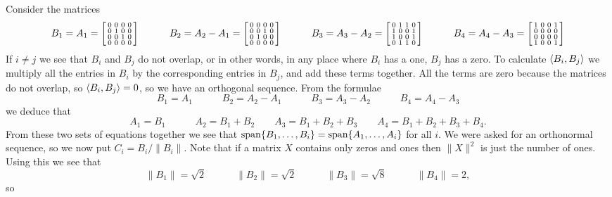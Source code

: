  Consider the matrices
 {\tiny \[
  B_1=A_1 = \left[\begin{smallmatrix} 0&0&0&0\\ 0&1&0&0\\ 0&0&1&0\\ 0&0&0&0\end{smallmatrix}\right]
  \hspace{3em}
  B_2=A_2-A_1 = \left[\begin{smallmatrix} 0&0&0&0\\ 0&0&1&0\\ 0&1&0&0\\ 0&0&0&0\end{smallmatrix}\right]
  \hspace{3em}
  B_3=A_3-A_2 = \left[\begin{smallmatrix} 0&1&1&0\\ 1&0&0&1\\ 1&0&0&1\\ 0&1&1&0\end{smallmatrix}\right]
  \hspace{3em}
  B_4=A_4-A_3 = \left[\begin{smallmatrix} 1&0&0&1\\ 0&0&0&0\\ 0&0&0&0\\ 1&0&0&1\end{smallmatrix}\right]
 \]}
 If $i\neq j$ we see that $B_i$ and $B_j$ do not overlap, or
 in other words, in any place where $B_i$ has a one, $B_j$
 has a zero.  To calculate $\langle B_i,B_j\rangle$ we multiply all
 the entries in $B_i$ by the corresponding entries in $B_j$,
 and add these terms together.  All the terms are zero
 because the matrices do not overlap, so $\langle B_i,B_j\rangle=0$,
 so we have an orthogonal sequence.  From the formulae
 \[ B_1=A_1     \hspace{3em}
    B_2=A_2-A_1 \hspace{3em}
    B_3=A_3-A_2 \hspace{3em}
    B_4=A_4-A_3
 \]
 we deduce that
 \[ A_1=B_1 \hspace{3em}
    A_2=B_1+B_2 \hspace{2em}
    A_3=B_1+B_2+B_3 \hspace{2em}
    A_4=B_1+B_2+B_3+B_4.
 \]
 From these two sets of equations together we see that
 $\operatorname{span}\{B_1,\dotsc,B_i\}=\operatorname{span}\{A_1,\dotsc,A_i\}$ for all
 $i$.  We were asked for an orthonormal sequence, so we now
 put $C_i=B_i/\|B_i\|$.  Note that if a matrix $X$ contains
 only zeros and ones then $\|X\|^2$ is just the number of
 ones.  Using this we see that
 \[ \|B_1\| = \sqrt{2} \hspace{3em}
    \|B_2\| = \sqrt{2} \hspace{3em}
    \|B_3\| = \sqrt{8} \hspace{3em}
    \|B_4\| = 2,
 \]
 so
